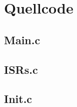 \section{Quellcode}
\label{app:Quellcode}
\subsection{Main.c}
%
\subsection{ISRs.c}

\subsection{Init.c}
